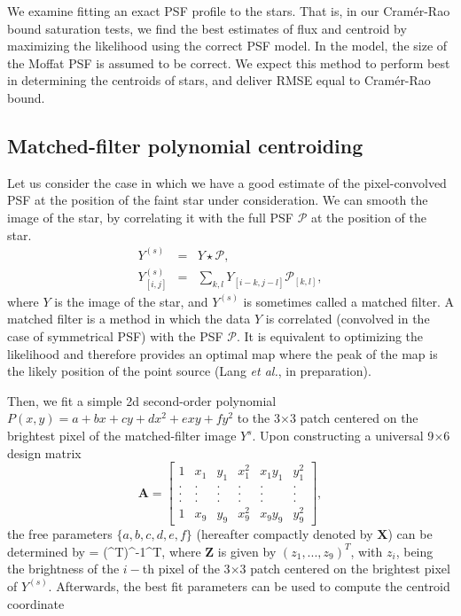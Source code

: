We examine fitting an exact PSF profile to the stars. That is, 
in our Cram\'{e}r-Rao bound saturation tests, we find the best
estimates of flux and centroid by maximizing the likelihood using 
the correct PSF model. In the model, the size of the Moffat PSF is 
assumed to be correct. We expect this method to perform best in 
determining the centroids of stars, and deliver RMSE equal to 
Cram\'{e}r-Rao bound.

\subsection{Matched-filter polynomial centroiding}

Let us consider the case in which we have a good estimate of the pixel-convolved PSF at
the position of the faint star under consideration. 
We can smooth the image of the star, by correlating it with the 
full PSF $\mathcal{P}$ at the position of the star.
\begin{eqnarray}
Y^{(s)} &=& Y \star \mathcal{P}, \\
Y^{(s)}_{[i,j]} &=& \sum_{k,l}Y_{[i-k,j-l]}\mathcal{P}_{[k,l]},
\end{eqnarray}
where $Y$ is the image of the star, and $Y^{(s)}$ is sometimes called a matched filter. 
A matched filter is a method in which the data $Y$ is correlated (convolved in the 
case of symmetrical PSF) with the PSF $\mathcal{P}$. It is equivalent to optimizing the 
likelihood and therefore provides an optimal map 
where the peak of the map is the likely position of the 
point source (Lang \emph{et al.}, in preparation).

Then, we fit a simple 2d second-order polynomial 
$P(x,y)=a+bx+cy+dx^2+exy+fy^2$ 
to the 3$\times$3 patch centered on the brightest pixel of the
matched-filter image $Y^{s}$.
Upon constructing a universal 9$\times$6 design matrix
\begin{equation}
    \mathbf{A} = 
    \begin{bmatrix}
        1 & x_{1} & y_{1} & x_{1}^{2} & x_{1}y_{1} & y_{1}^{2} \\
        . & . & . & . & . & .  \\
        . & . & . & . & . & .  \\
        . & . & . & . & . & .  \\
        1 & x_{9} & y_{9} & x_{9}^{2} & x_{9}y_{9} & y_{9}^{2}
    \end{bmatrix},
\end{equation}
the free parameters $\{a,b,c,d,e,f\}$
(hereafter compactly denoted by $\mathbf{X}$) can be determined by 
\beq
{} = (^{T})^{-1}^{T},
\label{linearfit}
\eeq
where $\mathbf{Z}$ is given by $(z_{1},...,z_{9})^{T}$,
with $z_{i}$, being the brightness of the $i-$th pixel of the 3$\times$3 patch centered on the brightest pixel of $Y^{(s)}$.
Afterwards, the best fit parameters can be used to compute the centroid coordinate


